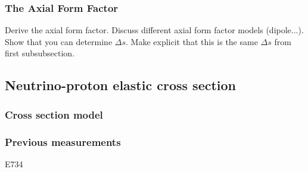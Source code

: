   \subsubsection{The Axial Form Factor}
    Derive the axial form factor. Discuss different axial form factor models
    (dipole...). Show that you can determine $\Delta s$. Make explicit that
    this is the same $\Delta s$ from first subsubsection.

\subsection{Neutrino-proton elastic cross section}\label{sec:probe}
  \subsubsection{Cross section model}

  \subsubsection{Previous measurements}
    E734

